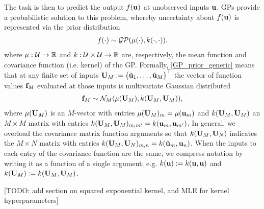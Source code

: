 \documentclass[12pt]{article}
\begin{document}
The task is then to predict the output $\f(\bpar)$ at unobserved inputs $\bpar$. GPs provide a probabilistic solution to this problem, 
whereby uncertainty about $\f(\bpar)$ is represented via the prior distribution 
\begin{align}
\f(\cdot) \sim \GP(\GPMean(\cdot), \GPKer(\cdot, \cdot)). \label{GP_prior_generic}
\end{align}
where $\GPMean: \parSpace \to \R$ and $\GPKer: \parSpace \times \parSpace \to \R$ are, respectively, the mean function and covariance function (i.e. kernel)
of the GP. Formally, \ref{GP_prior_generic} means that at any finite set of inputs 
$\designMat[M] := \begin{pmatrix} \tilde{\bpar}_1, \dots, \tilde{\bpar}_{M} \end{pmatrix}^\top$ the vector of function values $\fObs[M]$ evaluated at those inputs 
is multivariate Gaussian distributed
\begin{align}
\fObs[M] \sim \mathcal{N}_{M}(\GPMean(\designMat[M]), \GPKer(\designMat[M], \designMat[M])),
\end{align}
where $\GPMean(\designMat[M])$ is an $M$-vector with entries $\GPMean(\designMat[M])_m = \GPMean(\bpar_m)$ and 
$\GPKer(\designMat[M], \designMat[M])$ an $M \times M$ matrix with entries $\GPKer(\designMat[M], \designMat[M])_{m,m^\prime} = \GPKer(\bpar_m, \bpar_{m^\prime})$.
In general, we overload the covariance matrix function arguments so that $\GPKer(\designMat[M], \designMat[N])$ indicates the $M \times N$ matrix with entries 
$\GPKer(\designMat[M], \designMat[N])_{m,n} = \GPKer(\tilde{\bpar}_m, \bpar_n)$. 
When the inputs to each entry of the covariance function are the same, we compress notation by writing it as a function of a single argument; 
e.g. $\GPKer(\bpar) := \GPKer(\bpar, \bpar)$ and $\GPKer(\designMat[M]) := \GPKer(\designMat[M], \designMat[M])$. 

[TODO: add section on squared exponential kernel, and MLE for kernel hyperparameters]
\end{document}
